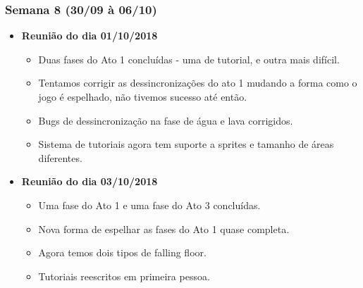 \documentclass[a4paper, 11pt]{article}
\begin{document}
\subsubsection{Semana 8 (30/09 à 06/10)}
	\begin{itemize} 
		\item \textbf{Reunião do dia 01/10/2018}

		\begin{itemize}
    		
    		\item Duas fases do Ato 1 concluídas - uma de tutorial, e outra mais difícil.
    		\item Tentamos corrigir as dessincronizações do ato 1 mudando a forma como o jogo é espelhado, não tivemos sucesso até então.
    		\item Bugs de dessincronização na fase de água e lava corrigidos.
    		\item Sistema de tutoriais agora tem suporte a sprites e tamanho de áreas diferentes.

   		\end{itemize}

		\item \textbf{Reunião do dia 03/10/2018}

		\begin{itemize}
    					
    		\item Uma fase do Ato 1 e uma fase do Ato 3 concluídas.
    		\item Nova forma de espelhar as fases do Ato 1 quase completa.
    		\item Agora temos dois tipos de falling floor.
    		\item Tutoriais reescritos em primeira pessoa.

		\end{itemize}

	\end{itemize}
\end{document}
